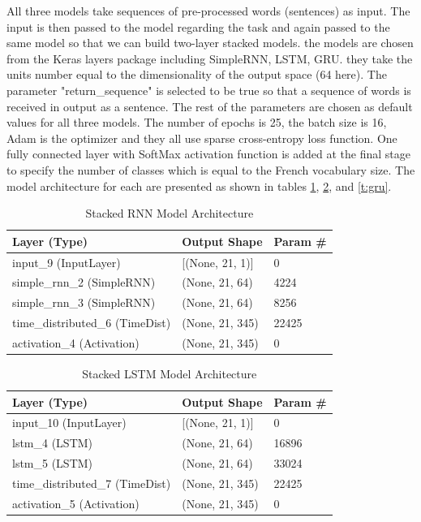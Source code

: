 \documentclass[12pt,oneside,geqno]{article}
\begin{document}
	All three models take sequences of pre-processed words (sentences) as input.  The input is then passed to the model regarding the task and again passed to the same model so that we can build two-layer stacked models. the models are chosen from the Keras layers package including SimpleRNN, LSTM, GRU. they take the units number equal to the dimensionality of the output space (64 here). The parameter "return\_sequence" is selected to be true so that a sequence of words is received in output as a sentence. The rest of the parameters are chosen as default values for all three models. The number of epochs is 25, the batch size is 16, Adam is the optimizer and they all use sparse cross-entropy loss function. One fully connected layer with SoftMax activation function is added at the final stage to specify the number of classes which is equal to the French vocabulary size. The model architecture for each are presented as shown in tables \ref{t:rnn}, \ref{t:lstm}, and \ref{t:gru}.
	
	\begin{table}[h]
		\centering
		\begin{tabular}{|l|l|l|}
			\hline
			Layer (Type)                    & Output Shape        & Param \# \\ \hline
			input\_9 (InputLayer)           & {[}(None, 21, 1){]} & 0        \\ \hline
			simple\_rnn\_2 (SimpleRNN)      & (None, 21, 64)      & 4224     \\ \hline
			simple\_rnn\_3 (SimpleRNN)      & (None, 21, 64)      & 8256     \\ \hline
			time\_distributed\_6 (TimeDist) & (None, 21, 345)     & 22425    \\ \hline
			activation\_4 (Activation)      & (None, 21, 345)     & 0        \\ \hline
		\end{tabular}
		\caption{Stacked RNN Model Architecture}
		\label{t:rnn}
	\end{table}
	
	\begin{table}[h]
		\centering
		\begin{tabular}{|l|l|l|}
			\hline
			Layer (Type)                    & Output Shape        & Param \# \\ \hline
			input\_10 (InputLayer)           & {[}(None, 21, 1){]} & 0        \\ \hline
			lstm\_4 (LSTM)      & (None, 21, 64)      & 16896     \\ \hline
			lstm\_5 (LSTM)      & (None, 21, 64)      & 33024     \\ \hline
			time\_distributed\_7 (TimeDist) & (None, 21, 345)     & 22425    \\ \hline
			activation\_5 (Activation)      & (None, 21, 345)     & 0        \\ \hline
		\end{tabular}
		\caption{Stacked LSTM Model Architecture}
		\label{t:lstm}
	\end{table}
	
\end{document}
